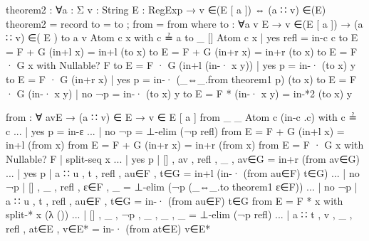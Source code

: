 \begin{agda}
theorem2 : ∀{a : Σ} {v : String} {E : RegExp}
  → v ∈(E [ a ]) ⇔ (a ∷ v) ∈(E)
theorem2 = record { to = to ; from = from }
  where
    to : ∀{a v E} → v ∈(E [ a ]) → (a ∷ v) ∈( E )
    to {a} {v} {Atom c} x with c ≟ a
    to {_} {[]} {Atom c} x | yes refl = in-c c
    to {E = F + G} (in+l x) = in+l (to x)
    to {E = F + G} (in+r x) = in+r (to x)
    to {E = F · G} x with Nullable? F
    to {E = F · G} (in+l (in-· x y)) | yes p
      = in-· (to x) y
    to {E = F · G} (in+r x)          | yes p
      = in-· (_⇔_.from theorem1 p) (to x)
    to {E = F · G} (in-· x y)        | no ¬p
      = in-· (to x) y
    to {E = F *} (in-· x y) = in-*2 (to x) y

    from : ∀ {a}{v}{E} → (a ∷ v) ∈ E → v ∈ E [ a ]
    from {_} {_} {Atom c} (in-c .c) with c ≟ c
    ... | yes p = in-ε
    ... | no ¬p = ⊥-elim (¬p refl)
    from {E = F + G} (in+l x) = in+l (from x)
    from {E = F + G} (in+r x) = in+r (from x)
    from {E = F · G} x with Nullable? F | split-seq x
    ... | yes p | [] , av , refl , _ , av∈G
      = in+r (from av∈G)
    ... | yes p | a ∷ u , t , refl , au∈F , t∈G
      = in+l (in-· (from au∈F) t∈G)
    ... | no ¬p | [] , _ , refl , ε∈F , _
      = ⊥-elim (¬p (_⇔_.to theorem1 ε∈F))
    ... | no ¬p | a ∷ u , t , refl , au∈F , t∈G
      = in-· (from au∈F) t∈G
    from {E = F *} x with split-* x (λ ())
    ... | [] , _ , ¬p , _ , _ , _ = ⊥-elim (¬p refl)
    ... | a ∷ t , v , _ , refl , at∈E , v∈E*
      = in-· (from at∈E) v∈E*
\end{agda}

